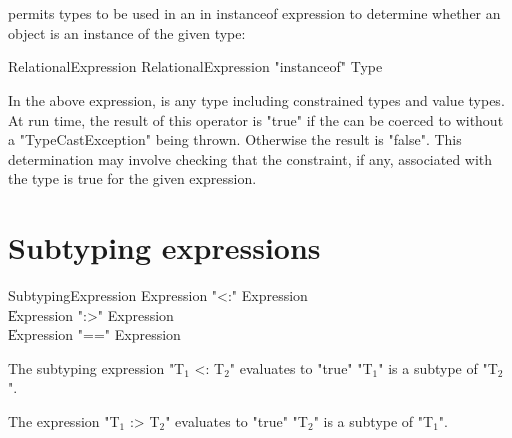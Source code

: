 
\section{}\label{instanceOf}

\Xten{} permits types to be used in an in instanceof expression
to determine whether an object is an instance of the given type:

\begin{grammar}
RelationalExpression \: RelationalExpression \xcd"instanceof" Type
\end{grammar}

In the above expression,  is any type including
constrained types and value types. 
At run time, the result of this operator is
\xcd"true" if the  can be
coerced
to  without a \xcd"TypeCastException" being
thrown.  Otherwise the result is \xcd"false".
This determination may involve checking
that the
constraint, if any, associated with the type is true for the
given expression.

\section{Subtyping expressions}

\begin{grammar}
SubtypingExpression \: Expression \xcd"<:" Expression \\
                    \| Expression \xcd":>" Expression \\
                    \| Expression \xcd"==" Expression \\
\end{grammar}

The subtyping expression \xcdmath"T$_1$ <: T$_2$"
evaluates to  \xcd"true"  
                         \xcdmath"T$_1$"
                         is a subtype of
                         \xcdmath"T$_2$".

The expression \xcdmath"T$_1$ :> T$_2$"
evaluates to  \xcd"true"  
                         \xcdmath"T$_2$"
                         is a subtype of
                         \xcdmath"T$_1$".

